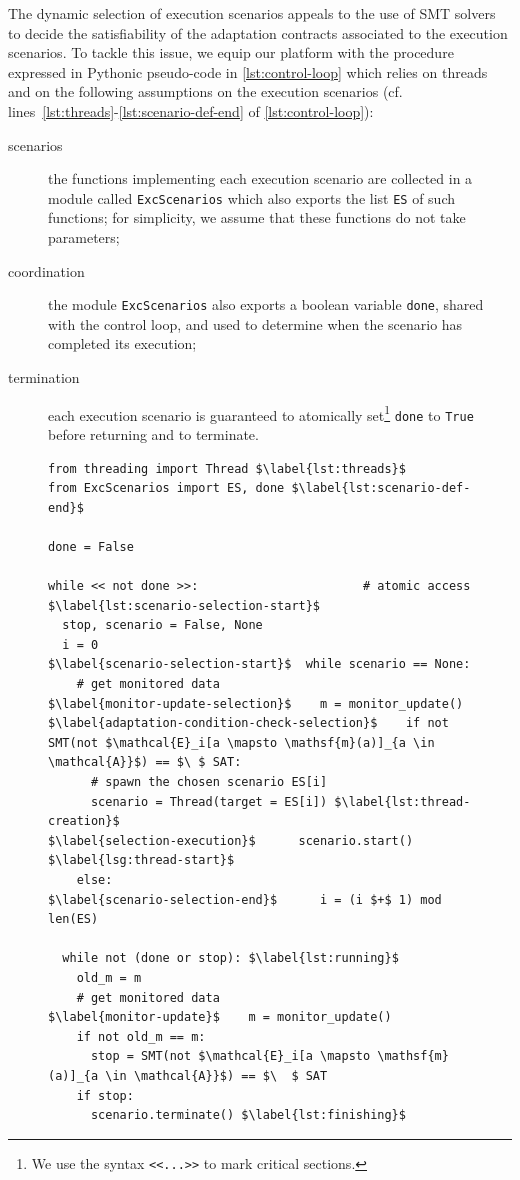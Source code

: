 The dynamic selection of execution scenarios appeals to the use of SMT
solvers to decide the satisfiability of the adaptation contracts
associated to the execution scenarios.
%
To tackle this issue, we equip our platform
with the procedure expressed in Pythonic pseudo-code in
\cref{lst:control-loop} which relies on threads and on the following
assumptions on the execution scenarios (cf.
lines~\ref{lst:threads}-\ref{lst:scenario-def-end} of \cref{lst:control-loop}):
\begin{description}
\item[scenarios] the functions implementing each execution scenario
  are collected in a module called \lstinline[style=pyinl]{ExcScenarios} which also
  exports the list \lstinline[style=pyinl]{ES} of such functions; for simplicity,
  we assume that these functions do not take parameters;
\item[coordination] the module \lstinline[style=pyinl]{ExcScenarios} also
  exports a boolean variable \lstinline[style=pyinl]{done}, shared with the control loop, 
  and used to determine when the scenario has completed its execution;
\item[termination] each execution scenario
  is guaranteed to
   atomically set\footnote{We use the syntax \lstinline[style=pyinl]{<<...>>}
	 to mark critical sections.} \lstinline[style=pyinl]{done} to \lstinline[style=pyinl]{True} before
  returning and to terminate.
\end{description}

\begin{figure}[t]
  \centering
\begin{lstlisting}[style=PythonStyle,caption={Pythonic pseudo-code implementing the control loop.},label={lst:control-loop}]
from threading import Thread $\label{lst:threads}$
from ExcScenarios import ES, done $\label{lst:scenario-def-end}$

done = False

while << not done >>:            	        # atomic access $\label{lst:scenario-selection-start}$
  stop, scenario = False, None 
  i = 0
$\label{scenario-selection-start}$  while scenario == None:
    # get monitored data
$\label{monitor-update-selection}$    m = monitor_update() 
$\label{adaptation-condition-check-selection}$    if not SMT(not $\mathcal{E}_i[a \mapsto \mathsf{m}(a)]_{a \in \mathcal{A}}$) == $\ $ SAT:
      # spawn the chosen scenario ES[i]
      scenario = Thread(target = ES[i]) $\label{lst:thread-creation}$
$\label{selection-execution}$      scenario.start() $\label{lsg:thread-start}$
    else:
$\label{scenario-selection-end}$      i = (i $+$ 1) mod len(ES)

  while not (done or stop): $\label{lst:running}$
    old_m = m
    # get monitored data
$\label{monitor-update}$    m = monitor_update()                
    if not old_m == m:
      stop = SMT(not $\mathcal{E}_i[a \mapsto \mathsf{m}(a)]_{a \in \mathcal{A}}$) == $\  $ SAT
    if stop:
      scenario.terminate() $\label{lst:finishing}$
\end{lstlisting}
\end{figure}

